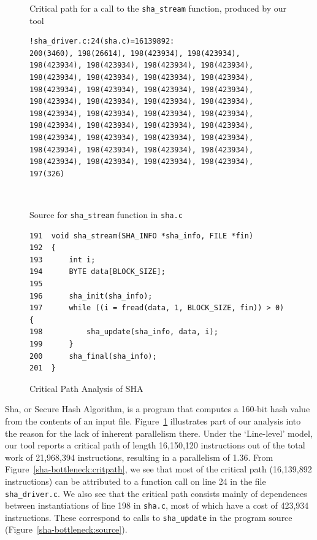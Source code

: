 \begin{figure}
  \begin{center}
    \scriptsize
    \begin{SubFloat}{\label{sha-bottleneck:critpath}Critical path for a call to the \texttt{sha\_stream} function, produced by our tool}
      \begin{minipage}{3in}
        \begin{verbatim}
!sha_driver.c:24(sha.c)=16139892:
200(3460), 198(26614), 198(423934), 198(423934),
198(423934), 198(423934), 198(423934), 198(423934),
198(423934), 198(423934), 198(423934), 198(423934),
198(423934), 198(423934), 198(423934), 198(423934),
198(423934), 198(423934), 198(423934), 198(423934),
198(423934), 198(423934), 198(423934), 198(423934),
198(423934), 198(423934), 198(423934), 198(423934),
198(423934), 198(423934), 198(423934), 198(423934),
198(423934), 198(423934), 198(423934), 198(423934),
198(423934), 198(423934), 198(423934), 198(423934),
197(326)
        \end{verbatim}
      \end{minipage}
    \end{SubFloat}
\\
    \begin{SubFloat}{\label{sha-bottleneck:source}Source for \texttt{sha\_stream} function in \texttt{sha.c}}
      \begin{minipage}{3in}
        \begin{verbatim}
191  void sha_stream(SHA_INFO *sha_info, FILE *fin)
192  {
193      int i;
194      BYTE data[BLOCK_SIZE];
195
196      sha_init(sha_info);
197      while ((i = fread(data, 1, BLOCK_SIZE, fin)) > 0) {
198          sha_update(sha_info, data, i);
199      }
200      sha_final(sha_info);
201  }
        \end{verbatim}
      \end{minipage}
    \end{SubFloat}
  \end{center}
  \caption{Critical Path Analysis of SHA}
  \label{sha-bottleneck}
\end{figure}

\textsf{Sha}, or Secure Hash Algorithm, is a program that computes a 160-bit hash value from the contents of an input file.
Figure~\ref{sha-bottleneck} illustrates part of our analysis into the reason for the lack of inherent parallelism there.
Under the `Line-level' model, our tool reports a critical path of length 16,150,120 instructions out of the total work of 21,968,394 instructions, resulting in a parallelism of 1.36.
From Figure~\ref{sha-bottleneck:critpath}, we see that most of the critical path (16,139,892 instructions) can be attributed to a function call on line 24 in the file \texttt{sha\_driver.c}.
We also see that the critical path consists mainly of dependences between instantiations of line 198 in \texttt{sha.c}, most of which have a cost of 423,934 instructions.
These correspond to calls to \texttt{sha\_update} in the program source (Figure~\ref{sha-bottleneck:source}).

